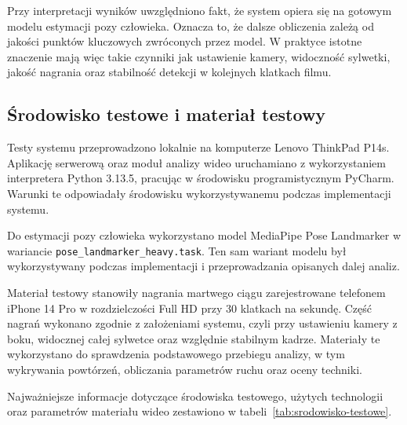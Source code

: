 Przy interpretacji wyników uwzględniono fakt, że system opiera się na gotowym modelu estymacji pozy człowieka. Oznacza to, że dalsze obliczenia zależą od jakości punktów kluczowych zwróconych przez model. W praktyce istotne znaczenie mają więc takie czynniki jak ustawienie kamery, widoczność sylwetki, jakość nagrania oraz stabilność detekcji w kolejnych klatkach filmu.

\subsection{Środowisko testowe i materiał testowy}

Testy systemu przeprowadzono lokalnie na komputerze Lenovo ThinkPad P14s. Aplikację serwerową oraz moduł analizy wideo uruchamiano z wykorzystaniem interpretera Python 3.13.5, pracując w środowisku programistycznym PyCharm. Warunki te odpowiadały środowisku wykorzystywanemu podczas implementacji systemu.

Do estymacji pozy człowieka wykorzystano model MediaPipe Pose Landmarker w wariancie \texttt{pose\_landmarker\_heavy.task}. Ten sam wariant modelu był wykorzystywany podczas implementacji i przeprowadzania opisanych dalej analiz.

Materiał testowy stanowiły nagrania martwego ciągu zarejestrowane telefonem iPhone 14 Pro w rozdzielczości Full HD przy 30 klatkach na sekundę. Część nagrań wykonano zgodnie z założeniami systemu, czyli przy ustawieniu kamery z boku, widocznej całej sylwetce oraz względnie stabilnym kadrze. Materiały te wykorzystano do sprawdzenia podstawowego przebiegu analizy, w tym wykrywania powtórzeń, obliczania parametrów ruchu oraz oceny techniki.

Najważniejsze informacje dotyczące środowiska testowego, użytych technologii oraz parametrów materiału wideo zestawiono w tabeli~\ref{tab:srodowisko-testowe}.

